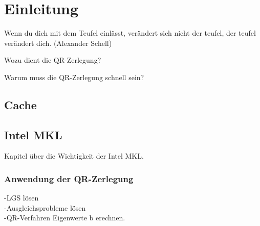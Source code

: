 \chapter{Einleitung}

Wenn du dich mit dem Teufel einlässt, verändert sich nicht der teufel, der teufel verändert dich. (Alexander Schell)


Wozu dient die QR-Zerlegung?


Warum muss die QR-Zerlegung schnell sein?

\section{Cache}

\section{Intel MKL}

Kapitel über die Wichtigkeit der Intel MKL.

\subsection{Anwendung der QR-Zerlegung}
-LGS lösen\\
-Ausgleichsprobleme lösen \\
-QR-Verfahren Eigenwerte b  erechnen.